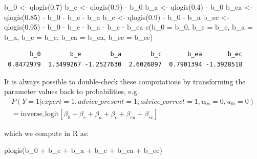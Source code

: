 \documentclass[
  man,
  floatsintext,
  longtable,
  a4paper,
  nolmodern,
  notxfonts,
  notimes,
  colorlinks=true,linkcolor=blue,citecolor=blue,urlcolor=blue]{apa7}
\newenvironment{Shaded}{\begin{snugshade}}{\end{snugshade}}
\newcommand{\AttributeTok}[1]{\textcolor[rgb]{0.40,0.45,0.13}{#1}}
\newcommand{\FloatTok}[1]{\textcolor[rgb]{0.68,0.00,0.00}{#1}}
\newcommand{\FunctionTok}[1]{\textcolor[rgb]{0.28,0.35,0.67}{#1}}
\newcommand{\NormalTok}[1]{\textcolor[rgb]{0.00,0.23,0.31}{#1}}
\newcommand{\OtherTok}[1]{\textcolor[rgb]{0.00,0.23,0.31}{#1}}
\newcommand{\SpecialCharTok}[1]{\textcolor[rgb]{0.37,0.37,0.37}{#1}}
\begin{document}
\begin{Shaded}
\begin{Highlighting}[]
\NormalTok{b\_0 }\OtherTok{\textless{}{-}} \FunctionTok{qlogis}\NormalTok{(}\FloatTok{0.7}\NormalTok{)}
\NormalTok{b\_e }\OtherTok{\textless{}{-}} \FunctionTok{qlogis}\NormalTok{(}\FloatTok{0.9}\NormalTok{) }\SpecialCharTok{{-}}\NormalTok{ b\_0}
\NormalTok{b\_a }\OtherTok{\textless{}{-}} \FunctionTok{qlogis}\NormalTok{(}\FloatTok{0.4}\NormalTok{) }\SpecialCharTok{{-}}\NormalTok{ b\_0}
\NormalTok{b\_ea }\OtherTok{\textless{}{-}} \FunctionTok{qlogis}\NormalTok{(}\FloatTok{0.85}\NormalTok{) }\SpecialCharTok{{-}}\NormalTok{ b\_0 }\SpecialCharTok{{-}}\NormalTok{ b\_e }\SpecialCharTok{{-}}\NormalTok{ b\_a}
\NormalTok{b\_c }\OtherTok{\textless{}{-}} \FunctionTok{qlogis}\NormalTok{(}\FloatTok{0.9}\NormalTok{) }\SpecialCharTok{{-}}\NormalTok{ b\_0 }\SpecialCharTok{{-}}\NormalTok{ b\_a}
\NormalTok{b\_ec }\OtherTok{\textless{}{-}} \FunctionTok{qlogis}\NormalTok{(}\FloatTok{0.95}\NormalTok{) }\SpecialCharTok{{-}}\NormalTok{ b\_0 }\SpecialCharTok{{-}}\NormalTok{ b\_e }\SpecialCharTok{{-}}\NormalTok{ b\_a }\SpecialCharTok{{-}}\NormalTok{ b\_c }\SpecialCharTok{{-}}\NormalTok{ b\_ea}
\FunctionTok{c}\NormalTok{(}\AttributeTok{b\_0 =}\NormalTok{ b\_0, }\AttributeTok{b\_e =}\NormalTok{ b\_e, }\AttributeTok{b\_a =}\NormalTok{ b\_a, }\AttributeTok{b\_c =}\NormalTok{ b\_c, }\AttributeTok{b\_ea =}\NormalTok{ b\_ea, }\AttributeTok{b\_ec =}\NormalTok{ b\_ec)}
\end{Highlighting}
\end{Shaded}

\begin{verbatim}
       b_0        b_e        b_a        b_c       b_ea       b_ec 
 0.8472979  1.3499267 -1.2527630  2.6026897  0.7901394 -1.3928518 
\end{verbatim}

It is always possible to double-check these computations by transforming
the parameter values back to probabilities, e.g.~ \[
\begin{aligned}
P(Y=1|expert = 1, advice\_present = 1, advice\_correct = 1, u_{0s} = 0, u_{0i} = 0)\\
= \text{inverse\_logit}[\beta_0 + \beta_e + \beta_a + \beta_c + \beta_{ea} + \beta_{ec}]
\end{aligned}
\]

which we compute in R as:

\begin{Shaded}
\begin{Highlighting}[]
\FunctionTok{plogis}\NormalTok{(b\_0 }\SpecialCharTok{+}\NormalTok{ b\_e }\SpecialCharTok{+}\NormalTok{ b\_a }\SpecialCharTok{+}\NormalTok{ b\_c }\SpecialCharTok{+}\NormalTok{ b\_ea }\SpecialCharTok{+}\NormalTok{ b\_ec)}
\end{Highlighting}
\end{Shaded}
\end{document}
